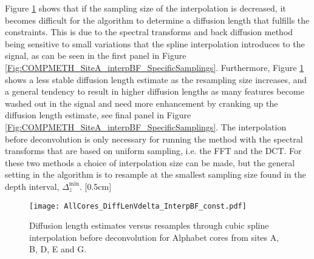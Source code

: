 \documentclass[../../CompleteThesis2/Complete_2ndDraft]{subfiles}
\begin{document}
Figure \ref{Fig:COMPMETH_SamplingVsDiffLen_interpBF} shows that if the sampling size of the interpolation is decreased, it becomes difficult for the algorithm to determine a diffusion length that fulfills the constraints. This is due to the spectral transforms and back diffusion method being sensitive to small variations that the spline interpolation introduces to the signal, as can be seen in the first panel in Figure \ref{Fig:COMPMETH_SiteA_interpBF_SpecificSamplings}. Furthermore, Figure \ref{Fig:COMPMETH_SamplingVsDiffLen_interpBF} shows a less stable diffusion length estimate as the resampling size increases, and a general tendency to result in higher diffusion lengths as many features become washed out in the signal and need more enhancement by cranking up the diffusion length estimate, see final panel in Figure \ref{Fig:COMPMETH_SiteA_interpBF_SpecificSamplings}. The interpolation before deconvolution is only necessary for running the method with the spectral transforms that are based on uniform sampling, i.e. the FFT and the DCT. For these two methods a choice of interpolation size can be made, but the general setting in the algorithm is to resample at the smallest sampling size found in the depth interval, $\Delta_z^{\text{min}}$.
[0.5cm]%


\begin{figure}[!htb]
	\centering
	\texttt{[image: AllCores\_DiffLenVdelta\_InterpBF\_const.pdf]}
	\caption[$\sigma$ vs. resampling size before deconvolution]{\small Diffusion length estimates versus resamples through cubic spline interpolation before deconvolution for Alphabet cores from sites A, B, D, E and G.}
	\label{Fig:COMPMETH_SamplingVsDiffLen_interpBF}
\end{figure}
\end{document}
